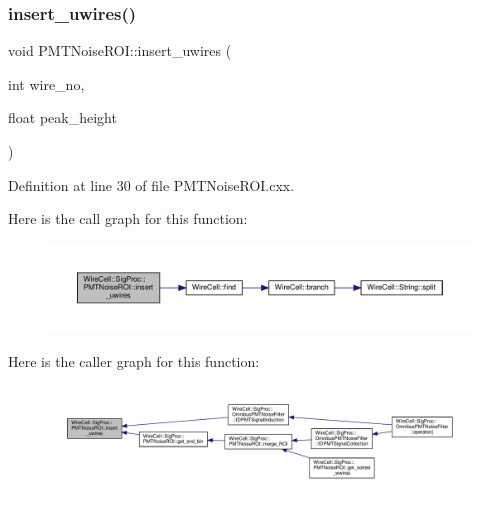\subsubsection{\texorpdfstring{insert\+\_\+uwires()}{insert\_uwires()}}
{\footnotesize\ttfamily void P\+M\+T\+Noise\+R\+O\+I\+::insert\+\_\+uwires (\begin{DoxyParamCaption}\item[{int}]{wire\+\_\+no,  }\item[{float}]{peak\+\_\+height }\end{DoxyParamCaption})}



Definition at line 30 of file P\+M\+T\+Noise\+R\+O\+I.\+cxx.

Here is the call graph for this function\+:
\nopagebreak
\begin{figure}[H]
\begin{center}
\leavevmode
\includegraphics[width=350pt]{class_wire_cell_1_1_sig_proc_1_1_p_m_t_noise_r_o_i_a97674ed5490b45c6e8e72292ee4012e7_cgraph}
\end{center}
\end{figure}
Here is the caller graph for this function\+:
\nopagebreak
\begin{figure}[H]
\begin{center}
\leavevmode
\includegraphics[width=350pt]{class_wire_cell_1_1_sig_proc_1_1_p_m_t_noise_r_o_i_a97674ed5490b45c6e8e72292ee4012e7_icgraph}
\end{center}
\end{figure}
\mbox{\label{class_wire_cell_1_1_sig_proc_1_1_p_m_t_noise_r_o_i_a117ae1e99cce01f1c72a55905f7fcf7e}} 
